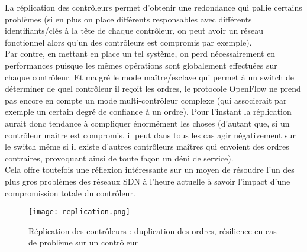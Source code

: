 La réplication des contrôleurs permet d'obtenir une redondance qui pallie certains problèmes (si en plus on place différents responsables avec différents identifiants/clés à la tête de chaque contrôleur, on peut avoir un réseau fonctionnel alors qu'un des contrôleurs est compromis par exemple).\\
Par contre, en mettant en place un tel système, on perd nécessairement en performances puisque les mêmes opérations sont globalement effectuées sur chaque contrôleur. Et malgré le mode maître/esclave qui permet à un switch de déterminer de quel contrôleur il reçoit les ordres, le protocole OpenFlow ne prend pas encore en compte un mode multi-contrôleur complexe (qui associerait par exemple un certain degré de confiance à un ordre). Pour l'instant la réplication aurait donc tendance à compliquer énormément les choses (d'autant que, si un contrôleur maître est compromis, il peut dans tous les cas agir négativement sur le switch même si il existe d'autres contrôleurs maîtres qui envoient des ordres contraires, provoquant ainsi de toute façon un déni de service).\\
Cela offre toutefois une réflexion intéressante sur un moyen de résoudre l'un des plus gros problèmes des réseaux SDN à l'heure actuelle à savoir l'impact d'une compromission totale du contrôleur.

\begin{figure}[h]
  	\centering
  	\texttt{[image: replication.png]}
  	\caption{Réplication des contrôleurs : duplication des ordres, résilience en cas de problème sur un contrôleur}
\end{figure}
